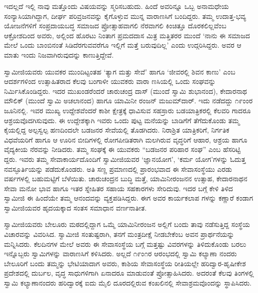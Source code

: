 ಇದಲ್ಲದೆ ಇಲ್ಲಿ ನಾವು ಮತ್ತೊಂದು ವಿಷಯವನ್ನು ಸ್ಮರಿಸಬಹುದು. ಹಿಂದೆ ಅವರಿನ್ನೂ ಒಬ್ಬ ಅನಾಮಧೇಯ ಸಂನ್ಯಾಸಿಯಾಗಿದ್ದಾಗ, ದೀರ್ಘ ಪರಿವ್ರಜನವನ್ನು ಕೈಗೊಳ್ಳುವ ಮುನ್ನ ವಾರಾಣಸಿಗೆ ಬಂದಿದ್ದರು. ತಮ್ಮ ಉದಾತ್ತ-ಭವ್ಯ ಯೋಜನೆಗಳಿಗೆ ಸಂಪ್ರದಾಯಬದ್ಧ ಸಮಾಜದ ಪ್ರೋತ್ಸಾಹವಾಗಲಿ ನೆರವಾಗಲಿ ಕಿಂಚಿತ್ತೂ ದೊರಕಲಿಲ್ಲವೆಂಬ ಆಕ್ರೋಶದಿಂದ ಅವರು, ಅಲ್ಲಿಂದ ಹೊರಟು ನಿಂತಾಗ ಪ್ರಮದದಾಸ ಮಿತ್ರ ಮತ್ತಿತರರ ಮುಂದೆ ‘ನಾನು ಈ ಸಮಾಜದ ಮೇಲೆ ಒಂದು ಬಾಂಬಿನಂತೆ ಸಿಡಿದೆರಗುವವರೆಗೂ ಇಲ್ಲಿಗೆ ಮತ್ತೆ ಬರುವುದಿಲ್ಲ’ ಎಂದು ಉದ್ಗರಿಸಿದ್ದರು. ಅವರ ಆ ಮಾತು ಇಂದು ನಿಜವಾಗಿರುವುದನ್ನು ಕಾಣುತ್ತಿದ್ದೇವೆ.

ಸ್ವಾಮೀಜಿಯವರು ಯುವಕರ ಮುಂದಿಟ್ಟಂತಹ ‘ತ್ಯಾಗ ಮತ್ತು ಸೇವೆ’ ಹಾಗೂ ‘ಜೀವರಲ್ಲಿ ಶಿವನ ಕಾಣು’ ಎಂಬ ಆದರ್ಶಗಳಿಂದ ಉತ್ಸಾಹಿತರಾದ ಕೆಲವು ಬಂಗಾಳೀ ಯುವಕರು ವಾರಾ ಣಸಿಯಲ್ಲಿ ಒಂದು ಸಂಘವನ್ನು ನಿರ್ಮಿಸಿಕೊಂಡಿದ್ದರು. ಇದರ ಮುಖಂಡರೆಂದರೆ ಚಾರುಚಂದ್ರ ದಾಸ್ (ಮುಂದೆ ಸ್ವಾಮಿ ಶುಭಾನಂದ), ಕೇದಾರನಾಥ ಮೌಲಿಕ್ (ಮುಂದೆ ಸ್ವಾಮಿ ಅಚಲಾನಂದ) ಹಾಗೂ ಯಾಮಿನೀ ರಂಜನ್ ಮಜುಮ್​ದಾರ್. ಇದು ನಡೆದದ್ದು ೧೯ಂಂರ ಜೂನಿನಲ್ಲಿ. ಇವರ ಮುಖ್ಯ ಉದ್ದೇಶವೆಂದರೆ ಕಾಶೀ ಕ್ಷೇತ್ರಕ್ಕೆ ಧಾವಿಸುವ ಸಹಸ್ರಾರು ಬಡಯಾತ್ರಿಕರಲ್ಲಿ ಕೆಲವರಿ ಗಾದರೂ ಆಶ್ರಯವೊದಗಿಸುವುದು. ಈ ಉದ್ದೇಶಕ್ಕಾಗಿ ಇವರು ಒಂದು ಪುಟ್ಟ ಮನೆಯನ್ನು ಬಾಡಿಗೆಗೆ ತೆಗೆದುಕೊಂಡು ತಮ್ಮ ಕೈಯಲ್ಲಿದ್ದ ಅಲ್ಪಸ್ವಲ್ಪ ಹಣದಿಂದಲೇ ಬಡಜನರ ಸೇವೆಯಲ್ಲಿ ತೊಡಗಿದರು. ನಿರಾಶ್ರಿತ ಯಾತ್ರಿಕರಿಗೆ, ನಿರ್ಗತಿಕ ವಿಧವೆಯರಿಗೆ ಹಾಗೂ ಆ ಊರಿನ ಬೀದಿಗಳಲ್ಲಿ ರೋಗಪೀಡಿತರಾಗಿ ಮಲಗಿರುವ ವೃದ್ಧರಿಗೆ ಆಹಾರ, ಆಶ್ರಯ ಹಾಗೂ ವೈದ್ಯಕೀಯ ನೆರವನ್ನು ನೀಡಿದರು. ತಮ್ಮ ಸಂಘಕ್ಕೆ ಈ ಯುವಕರು “ಬಡಜನರ ಪರಿಹಾರ ಸಂಘ” ಎಂಬ ಹೆಸರಿಟ್ಟಿ ದ್ದರು. ಇವರು ತಮ್ಮ ಸೇವಾಕಾರ್ಯದೊಂದಿಗೆ ಸ್ವಾಮೀಜಿಯವರ ‘ಜ್ಞಾನಯೋಗ’, ‘ಕರ್ಮ ಯೋಗ’ಗಳನ್ನು ಓದುತ್ತ ನವಸ್ಫೂರ್ತಿಯನ್ನು ಪಡೆದುಕೊಂಡರು. ಅತಿ ಸಣ್ಣ ಪ್ರಮಾಣದಲ್ಲಿ ಪ್ರಾರಂಭವಾದ ಈ ಸೇವಾಸಂಸ್ಥೆಯು ಎರಡು ವರ್ಷಗಳಲ್ಲಿ ಬಹುಮಟ್ಟಿಗೆ ಬೆಳೆಯಿತು. ಚಾರುಚಂದ್ರನ ಬುದ್ಧಿ ಮತ್ತೆ, ಯಾಮಿನೀರಂಜನನ ಉತ್ಸಾಹ, ಕೇದಾರನಾಥನ ಸೇವಾ ಮನೋ ಭಾವ ಹಾಗೂ ಇತರ ಸ್ನೇಹಿತರ ಸಹಾಯ ಸಹಕಾರಗಳು ಸೇರಿದುವು. ಇದರ ಬಗ್ಗೆ ಕೇಳಿ ತಿಳಿದ ಸ್ವಾಮೀಜಿ ಈ ಹಿಂದೆಯೇ ತಮ್ಮ ಆನಂದವನ್ನು ವ್ಯಕ್ತಪಡಿಸಿದ್ದರು. ಈಗ ಅವರ ಕಾರ್ಯಕಲಾಪ ಗಳನ್ನು ಕಣ್ಣಾರೆ ಕಂಡಾಗ ಸ್ವಾಮೀಜಿಯವರ ಹೃದಯಕ್ಕಾದ ಸಂತಸ ಸಮಾಧಾನ ವರ್ಣನಾತೀತ.

ಸ್ವಾಮೀಜಿಯವರು ಬೇಲೂರು ಮಠದಲ್ಲಿದ್ದಾಗ ಒಮ್ಮೆ ಯಾಮಿನೀರಂಜನ ಅಲ್ಲಿಗೆ ಬಂದು ತಾವು ನಡೆಸುತ್ತಿದ್ದ ಸಂಸ್ಥೆಯ ವಿಚಾರವನ್ನು ವಿವರಿಸಿದ. ಸ್ವಾಮೀಜಿ ಸಂತುಷ್ಟರಾಗಿ, ತನಗೆ ಮಂತ್ರದೀಕ್ಷೆ ನೀಡಬೇಕೆಂಬ ಅವನ ಪ್ರಾರ್ಥನೆಯನ್ನು ಮನ್ನಿಸಿದರು. ಕೆಲದಿನಗಳ ಮೇಲೆ ಅವರು ಈ ಸೇವಾಸಂಸ್ಥೆಯ ಬಗ್ಗೆ ಮತ್ತಷ್ಟು ವಿವರಗಳನ್ನು ತಿಳಿದುಕೊಂಡು ಬರಲು ಇನ್ನೊಬ್ಬರು ಸ್ವಾಮಿಗಳನ್ನು ವಾರಾಣಸಿಗೆ ಕಳಿಸಿದರು. ಅಲ್ಲದೆ ೧೯ಂ೧ರ ಆರಂಭದಲ್ಲಿ ಸ್ವಾಮಿ ಕಲ್ಯಾಣಾ ನಂದರು ಬೇಲೂರಿಗೆ ಬಂದು ತಮ್ಮನ್ನು ಭೇಟಿಯಾದಾಗ ಅವರು, ಕಾಶಿಯ ಸೇವಾಸಂಸ್ಥೆಯ ರೀತಿಯಲ್ಲೇ ಹರಿದ್ವಾರ-ಹೃಷೀಕೇಶ ಪ್ರದೇಶದಲ್ಲಿ ದುರ್ಬಲ, ವೃದ್ಧ ಸಾಧುಗಳಿಗಾಗಿ ಏನಾದರೂ ಮಾಡುವಂತೆ ಪ್ರೋತ್ಸಾಹಿಸಿದರು. ಅದರಂತೆ ಕೆಲವು ತಿಂಗಳಲ್ಲಿ ಸ್ವಾಮಿ ಕಲ್ಯಾಣಾನಂದರು ಹರಿದ್ವಾರಕ್ಕೆ ಐದು ಮೈಲಿ ದೂರದಲ್ಲಿರುವ ಕಂಖಲಿನಲ್ಲಿ ಸೇವಾಶ್ರಮವೊಂದನ್ನು ಸ್ಥಾಪಿಸಿದರು.

